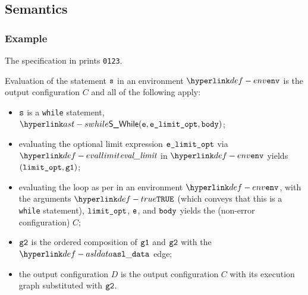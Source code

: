 \subsection{Semantics}
\subsubsection{Example}
The specification in  prints \texttt{0123}.

\ProseParagraph
Evaluation of the statement $\vs$ in an environment $\env$ is
the output configuration $C$ and all of the following apply:
\begin{itemize}
  \item $\vs$ is a \texttt{while} statement, $\SWhile(\ve, \velimitopt, \vbody)$;
  \item evaluating the optional limit expression $\velimitopt$ via $\evallimit$ in $\env$
        yields $(\vlimitopt, \vgone)$\ProseOrError;
  \item evaluating the loop as per  in an environment $\env$,
  with the arguments $\True$ (which conveys that this is a \texttt{while} statement), $\vlimitopt$, $\ve$, and $\vbody$
  yields the (non-error configuration) $C$\ProseOrError;
  \item $\vgtwo$ is the ordered composition of $\vgone$ and $\vgtwo$ with the $\asldata$ edge;
  \item the output configuration $D$ is the output configuration $C$ with its execution graph
        substituted with $\vgtwo$.
\end{itemize}
\FormallyParagraph
\begin{mathpar}
\end{mathpar}

